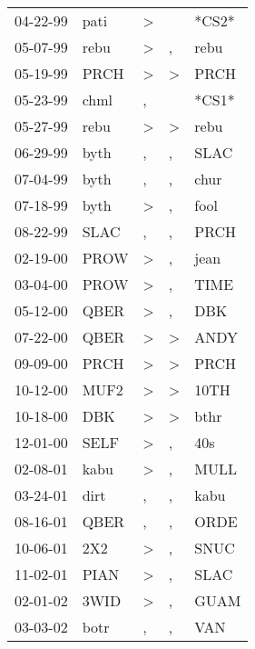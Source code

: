 \begin{supertabular}{lllll}
 04-22-99 &   pati &     \textgreater &                  &  *CS2* \\
 05-07-99 &   rebu &     \textgreater &                , &   rebu \\
 05-19-99 &   PRCH &     \textgreater &     \textgreater &   PRCH \\
 05-23-99 &   chml &                , &                  &  *CS1* \\
 05-27-99 &   rebu &     \textgreater &     \textgreater &   rebu \\
 06-29-99 &   byth &                , &                , &   SLAC \\
 07-04-99 &   byth &                , &                , &   chur \\
 07-18-99 &   byth &     \textgreater &                , &   fool \\
 08-22-99 &   SLAC &                , &                , &   PRCH \\
 02-19-00 &   PROW &     \textgreater &                , &   jean \\
 03-04-00 &   PROW &     \textgreater &                , &   TIME \\
 05-12-00 &   QBER &     \textgreater &                , &    DBK \\
 07-22-00 &   QBER &     \textgreater &     \textgreater &   ANDY \\
 09-09-00 &   PRCH &     \textgreater &     \textgreater &   PRCH \\
 10-12-00 &   MUF2 &     \textgreater &     \textgreater &   10TH \\
 10-18-00 &    DBK &     \textgreater &     \textgreater &   bthr \\
 12-01-00 &   SELF &     \textgreater &                , &    40s \\
 02-08-01 &   kabu &     \textgreater &                , &   MULL \\
 03-24-01 &   dirt &                , &                , &   kabu \\
 08-16-01 &   QBER &                , &                , &   ORDE \\
 10-06-01 &    2X2 &     \textgreater &                , &   SNUC \\
 11-02-01 &   PIAN &     \textgreater &                , &   SLAC \\
 02-01-02 &   3WID &     \textgreater &                , &   GUAM \\
 03-03-02 &   botr &                , &                , &    VAN \\

\end{supertabular}

